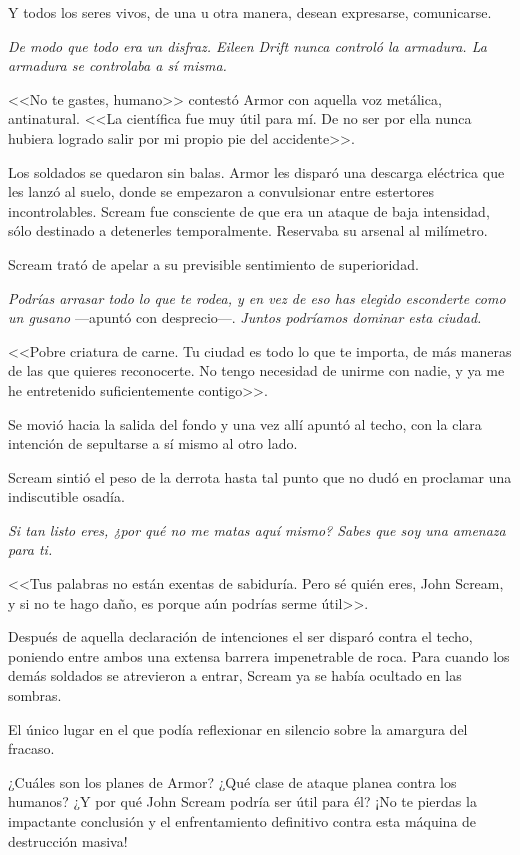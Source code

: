 Y todos los seres vivos, de una u otra manera, desean expresarse, comunicarse.

\emph{De modo que todo era un disfraz. Eileen Drift nunca controló la armadura. La armadura se controlaba a sí misma.}

<<No te gastes, humano>> contestó Armor con aquella voz metálica, antinatural. <<La científica fue muy útil para mí. De no ser por ella nunca hubiera logrado salir por mi propio pie del accidente>>.

Los soldados se quedaron sin balas. Armor les disparó una descarga eléctrica que les lanzó al suelo, donde se empezaron a convulsionar entre estertores incontrolables. Scream fue consciente de que era un ataque de baja intensidad, sólo destinado a detenerles temporalmente. Reservaba su arsenal al milímetro.

Scream trató de apelar a su previsible sentimiento de superioridad.

\emph{Podrías arrasar todo lo que te rodea, y en vez de eso has elegido esconderte como un gusano} ---apuntó con desprecio---. \emph{Juntos podríamos dominar esta ciudad.}

<<Pobre criatura de carne. Tu ciudad es todo lo que te importa, de más maneras de las que quieres reconocerte. No tengo necesidad de unirme con nadie, y ya me he entretenido suficientemente contigo>>.

Se movió hacia la salida del fondo y una vez allí apuntó al techo, con la clara intención de sepultarse a sí mismo al otro lado.

Scream sintió el peso de la derrota hasta tal punto que no dudó en proclamar una indiscutible osadía.

\emph{Si tan listo eres, ¿por qué no me matas aquí mismo? Sabes que soy una amenaza para ti.}

<<Tus palabras no están exentas de sabiduría. Pero sé quién eres, John Scream, y si no te hago daño, es porque aún podrías serme útil>>.

Después de aquella declaración de intenciones el ser disparó contra el techo, poniendo entre ambos una extensa barrera impenetrable de roca. Para cuando los demás soldados se atrevieron a entrar, Scream ya se había ocultado en las sombras.

El único lugar en el que podía reflexionar en silencio sobre la amargura del fracaso.

\begin{next}
    ¿Cuáles son los planes de Armor? ¿Qué clase de ataque planea contra los humanos? ¿Y por qué John Scream podría ser útil para él? ¡No te pierdas la impactante conclusión y el enfrentamiento definitivo contra esta máquina de destrucción masiva!
\end{next}

\endinput
